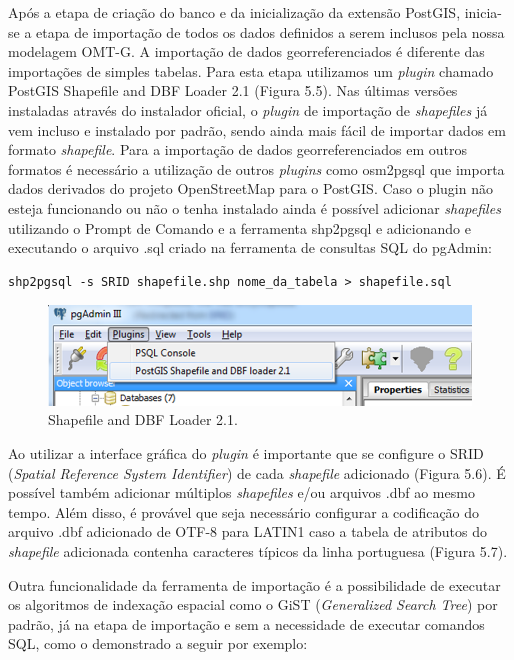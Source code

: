 Após a etapa de criação do banco e da inicialização da extensão PostGIS, inicia-se a etapa de importação de todos os dados definidos a serem inclusos pela nossa modelagem OMT-G. A importação de dados georreferenciados é diferente das importações de simples tabelas. Para esta etapa utilizamos um \textit{plugin} chamado PostGIS Shapefile and DBF Loader 2.1 (Figura 5.5). Nas últimas versões instaladas através do instalador oficial, o \textit{plugin} de importação de \textit{shapefiles} já vem incluso e instalado por padrão, sendo ainda mais fácil de importar dados em formato \textit{shapefile}. Para a importação de dados georreferenciados em outros formatos é necessário a utilização de outros \textit{plugins} como osm2pgsql que importa dados derivados do projeto OpenStreetMap para o PostGIS. Caso o plugin não esteja funcionando ou não o tenha instalado ainda é possível adicionar \textit{shapefiles} utilizando o Prompt de Comando e a ferramenta shp2pgsql e adicionando e executando o arquivo .sql criado na ferramenta de consultas SQL do pgAdmin:

	\begin{lstlisting}[float,floatplacement=H]
		shp2pgsql -s SRID shapefile.shp nome_da_tabela > shapefile.sql
	\end{lstlisting}

	\begin{figure}
		\centering
		\includegraphics[width=1\linewidth]{data/shapefile_loader}
		\caption{Shapefile and DBF Loader 2.1.}
		\label{fig:shapefileloader}
	\end{figure}
	
Ao utilizar a interface gráfica do \textit{plugin} é importante que se configure o SRID (\textit{Spatial Reference System Identifier}) de cada \textit{shapefile} adicionado (Figura 5.6). É possível também adicionar múltiplos \textit{shapefiles} e/ou arquivos .dbf ao mesmo tempo. Além disso, é provável que seja necessário configurar a codificação do arquivo .dbf adicionado de OTF-8 para LATIN1 caso a tabela de atributos do \textit{shapefile} adicionada contenha caracteres típicos da linha portuguesa (Figura 5.7).

Outra funcionalidade da ferramenta de importação é a possibilidade de executar os algoritmos de indexação espacial como o GiST (\textit{Generalized Search Tree}) por padrão, já na etapa de importação e sem a necessidade de executar comandos SQL, como o demonstrado a seguir por exemplo:
	
